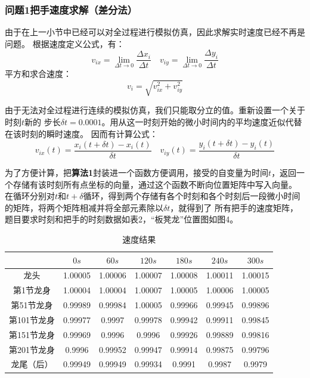 \documentclass{cumcmthesis1}
\begin{document}
\subsubsection{\textbf{问题1}把手速度求解（差分法）}
由于在上一小节中已经可以对全过程进行模拟仿真，因此求解实时速度已经不再是问题。
根据速度定义公式，有：
\begin{equation}
    v_{ix}=\lim_{\Delta t \to 0}  \frac{\Delta x_i}{\Delta t} \quad v_{iy}=\lim_{\Delta t \to 0}  \frac{\Delta y_i}{\Delta t} 
\end{equation}
平方和求合速度：
\begin{equation}
    v_{i}=\sqrt{v_{ix}^2+v_{iy}^2}
\end{equation}
\par
由于无法对全过程进行连续的模拟仿真，我们只能取分立的值。重新设置一个关于时刻$t$新的
步长$ \delta t=0.0001$。用从这一时刻开始的微小时间内的平均速度近似代替在该时刻的瞬时速度。
因而有计算公式：
\begin{equation}
    v_{ix}(t)= \frac{ x_i(t+\delta t)-x_i(t)}{\delta t} \quad v_{iy}(t)= \frac{ y_i(t+\delta t)-y_i(t)}{\delta t} 
\end{equation}
\par
为了方便计算，把\textbf{算法1}封装进一个函数方便调用，接受的自变量为时间$t$，返回一个存储有该时刻所有点坐标的向量，通过这个函数不断向位置矩阵中写入向量。
在循环分别对$t$和$t+\delta$循环，得到两个存储有各个时刻和各个时刻后一段微小时间的矩阵，将两个矩阵相减并将全部元素除以$\delta t$，就得到了
所有把手的速度矩阵，题目要求时刻和把手的时刻数据如表2，“板凳龙”位置图如图4。



\begin{table}[h!]
    \caption{速度结果}
    \centering
    \begin{tabular}{|c|c|c|c|c|c|c|}
    \hline
     & $0s$ & $60s$ & $120s$ & $180s$ & $240s$ & $300s$ \\
    \hline
    龙头 & 1.00005& 1.00006&1.00007&1.00008&1.00011&1.00015\\
    \hline
     第1节龙身& 1.00004 & 1.00004 & 1.00007 & 1.00005& 1.00006 & 1.00005 \\
    \hline
     第51节龙身& 0.99989 & 0.99984 & 1.00005 & 0.99966 &0.99945 & 0.99896 \\
    \hline
     第101节龙身& 0.99977 & 0.9997 & 0.99978 & 0.99942 & 0.99911 & 0.99845 \\
    \hline
     第151节龙身& 0.99969 &0.9996  &0.9996  & 0.99926 & 0.99889& 0.99816 \\
    \hline
     第201节龙身& 0.9996 & 0.99952 & 0.99947 & 0.99914 & 0.99875 & 0.99796 \\
    \hline
     龙尾（后）& 0.99949 & 0.99949 & 0.99934 & 0.9991 & 0.9987 & 0.9979\\
    \hline
    \end{tabular}
    \label{tab:example}
\end{table}
\end{document}

